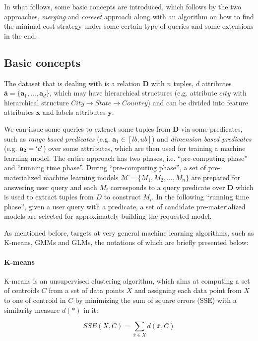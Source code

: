 In what follows, some basic concepts are introduced, which follows by the two approaches, {\em merging} and {\em coreset} approach along with an algorithm on how to find the minimal-cost strategy under some certain type of queries and some extensions in the end.


\subsection{Basic concepts}
The dataset that \cite{hasani2018efficient} is dealing with is a relation $\textbf{D}$ with $n$ tuples, $d$ attributes $\bar{\textbf{a}} = \{\textbf{a}_1, \dots, \textbf{a}_d\}$, which may have hierarchical structures (e.g. attribute $city$ with hierarchical structure $City \rightarrow State \rightarrow Country$) and can be divided into feature attributes $\bar{\textbf{x}}$ and labels attributes $\bar{\textbf{y}}$.

We can issue some queries to extract some tuples from $\textbf{D}$ via some predicates, such as {\em range based predicates} (e.g. $\textbf{a}_1 \in [lb, ub]$) and {\em dimension based predicates} (e.g. $\textbf{a}_2 = `c'$) over some attributes, which are then used for training a machine learning model. The entire approach has two phases, i.e. ``pre-computing phase'' and ``running time phase''. During ``pre-computing phase'', a set of pre-materialized machine learning models $\mathcal{M} = \{M_1, M_2, \dots, M_n\}$ are prepared for answering user query and each $M_i$ corresponds to a query predicate over $\textbf{D}$ which is used to extract tuples from $D$ to construct $M_i$. In the following ``running time phase'', given a user query with a predicate, a set of candidate pre-materialized models are selected for approximately building the requested model.

As mentioned before, \cite{hasani2018efficient} targets at very general machine learning algorithms, such as K-means, GMMs and GLMs, the notations of which are briefly presented below:

\paragraph{K-means} K-means is an unsupervised clustering algorithm, which aims at computing a set of centroids $C$ from a set of data points $X$ and assigning each data point from $X$ to one of centroid in $C$ by minimizing the sum of square errors (SSE) with a similarity measure $d(*)$ in it:

\begin{equation}\label{eq: sse_k_means}
    SSE(X, C) = \sum_{\bar{x} \in X}d(\bar{x}, C)
\end{equation}

